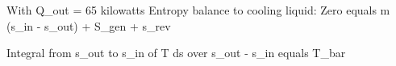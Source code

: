 With Q_out = 65 kilowatts  
Entropy balance to cooling liquid:  
Zero equals m (s_in - s_out) + S_gen + s_rev  

Integral from s_out to s_in of T ds over s_out - s_in equals T_bar